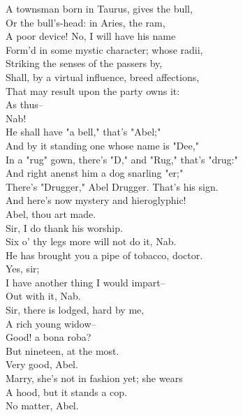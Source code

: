 \documentclass{memoir}
\begin{document}
\begin{drama*}
 A townsman born in Taurus, gives the bull,\\
 Or the bull's-head: in Aries, the ram,\\
 A poor device! No, I will have his name\\
 Form'd in some mystic character; whose radii,\\
 Striking the senses of the passers by,\\
 Shall, by a virtual influence, breed affections,\\
 That may result upon the party owns it:\\
 As thus--\\
\facespeaks {} Nab!\\
\subtlespeaks {} He shall have "a bell," that's "Abel;"\\
 And by it standing one whose name is "Dee,"\\
 In a "rug" gown, there's "D," and "Rug," that's "drug:"\\
 And right anenst him a dog snarling "er;"\\
 There's "Drugger," Abel Drugger. That's his sign.\\
 And here's now mystery and hieroglyphic!\\
\facespeaks  Abel, thou art made.\\
\druggerspeaks {} Sir, I do thank his worship.\\
\facespeaks  Six o' thy legs more will not do it, Nab.\\
 He has brought you a pipe of tobacco, doctor.\\
\druggerspeaks  Yes, sir;\\
 I have another thing I would impart--\\
\facespeaks  Out with it, Nab.\\
\druggerspeaks {} Sir, there is lodged, hard by me,\\
 A rich young widow--\\
\facespeaks {} Good! a bona roba?\\
\druggerspeaks  But nineteen, at the most.\\
\facespeaks {} Very good, Abel.\\
\druggerspeaks  Marry, she's not in fashion yet; she wears\\
 A hood, but it stands a cop.\\
\facespeaks {} No matter, Abel.\\

\end{drama*}
\end{document}
